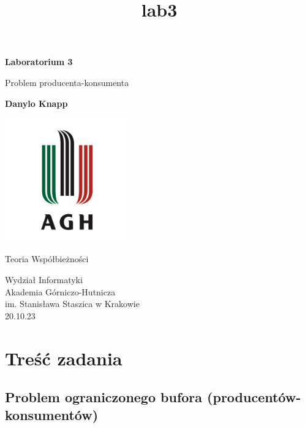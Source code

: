 \documentclass[11pt]{article}
\title{lab3}
\begin{document}
    
\begin{titlepage}
    \begin{center}
        \vspace*{1cm}
 
        \textbf{Laboratorium 3}
 
        \vspace{0.5cm}
        Problem producenta-konsumenta
             
        \vspace{1.5cm}
 
        \textbf{Danylo Knapp}

        \vfill

        \includegraphics[width=0.4\textwidth]{../report-templates/agh-logo.png}
 
        \vfill
             
        Teoria Współbieżności
             
        \vspace{0.8cm}

        Wydział Informatyki\\
        Akademia Górniczo-Hutnicza\\
        im. Stanisława Staszica w Krakowie\\
        20.10.23
             
    \end{center}
\end{titlepage}
    
    

    
    \hypertarget{treux15bux107-zadania}{%
\section{Treść zadania}\label{treux15bux107-zadania}}

\hypertarget{problem-ograniczonego-bufora-producentuxf3w-konsumentuxf3w}{%
\subsection{Problem ograniczonego bufora
(producentów-konsumentów)}\label{problem-ograniczonego-bufora-producentuxf3w-konsumentuxf3w}}
\end{document}
